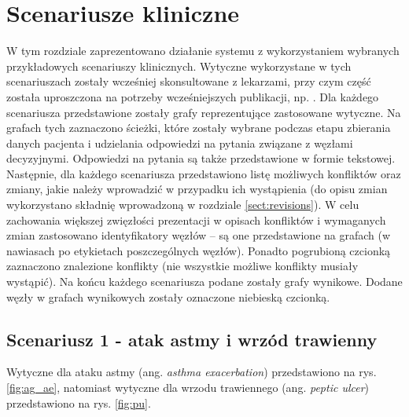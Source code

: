 \chapter{Scenariusze kliniczne}
W tym rozdziale zaprezentowano działanie systemu z wykorzystaniem wybranych przykładowych scenariuszy klinicznych. Wytyczne wykorzystane w tych scenariuszach zostały wcześniej skonsultowane z lekarzami, przy czym część została uproszczona na potrzeby wcześniejszych publikacji, np. \citep{SzWilk,SzWilk2}. Dla każdego scenariusza przedstawione zostały grafy reprezentujące zastosowane wytyczne. Na grafach tych zaznaczono ścieżki, które zostały wybrane podczas etapu zbierania danych pacjenta i udzielania odpowiedzi na pytania związane z węzłami decyzyjnymi. Odpowiedzi na pytania są także przedstawione w formie tekstowej. Następnie, dla każdego scenariusza przedstawiono listę możliwych konfliktów oraz zmiany, jakie należy wprowadzić w przypadku ich wystąpienia (do opisu zmian wykorzystano składnię wprowadzoną w rozdziale \ref{sect:revisions}). W celu zachowania większej zwięzłości prezentacji w opisach konfliktów i wymaganych zmian zastosowano identyfikatory węzłów -- są one przedstawione na grafach (w nawiasach po etykietach poszczególnych węzłów). Ponadto pogrubioną czcionką zaznaczono znalezione konflikty (nie wszystkie możliwe konflikty musiały wystąpić). Na końcu każdego scenariusza podane zostały grafy wynikowe. Dodane węzły w grafach wynikowych zostały oznaczone niebieską czcionką.

\section{Scenariusz 1 - atak astmy i wrzód trawienny}
Wytyczne dla ataku astmy (ang. \textit{asthma exacerbation}) przedstawiono na rys. \ref{fig:ag_ae}, natomiast wytyczne dla wrzodu trawiennego (ang. \textit{peptic ulcer}) przedstawiono na rys. \ref{fig:pu}.

